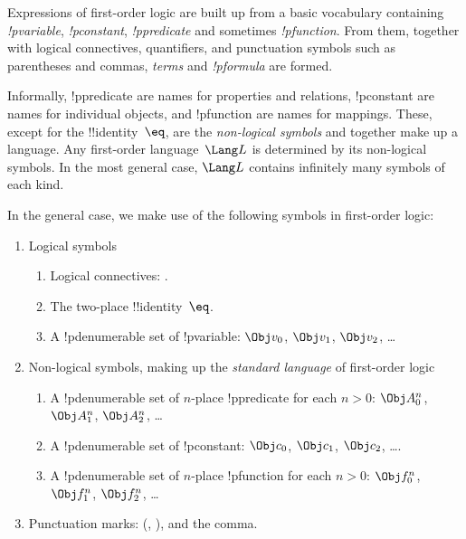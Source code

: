\documentclass[../../include/open-logic-section]{subfiles}
\begin{document}



Expressions of first-order logic are built up from a basic vocabulary
containing \emph{!p{variable}}, \emph{!p{constant}},
\emph{!p{predicate}} and sometimes \emph{!p{function}}.  From them,
together with logical connectives, quantifiers, and punctuation
symbols such as parentheses and commas, \emph{terms} and
\emph{!p{formula}} are formed.

\begin{explain}
Informally, !p{predicate} are names for properties and relations,
!p{constant} are names for individual objects, and !p{function} are
names for mappings.  These, except for the !!{identity}~$\eq$, are the
\emph{non-logical symbols} and together make up a language.  Any
first-order language~$\Lang L$ is determined by its non-logical
symbols.  In the most general case, $\Lang L$ contains infinitely many
symbols of each kind.
\end{explain}

In the general case, we make use of the following symbols in
first-order logic:

\begin{enumerate}
\item Logical symbols
\begin{enumerate}
\item Logical connectives:
  \startycommalist
  .
\item The two-place !!{identity}~$\eq$.
\item A !p{denumerable} set of !p{variable}: $\Obj v_0$, $\Obj v_1$, $\Obj
  v_2$, \dots
\end{enumerate}
\item Non-logical symbols, making up the \emph{standard
  language} of first-order logic
\begin{enumerate}
\item A !p{denumerable} set of $n$-place !p{predicate} for each $n>0$: $\Obj
  A^n_0$, $\Obj A^n_1$, $\Obj A^n_2$, \dots
\item A !p{denumerable} set of !p{constant}: $\Obj c_0$, $\Obj c_1$, $\Obj
  c_2$, \dots.
\item A !p{denumerable} set of $n$-place !p{function} for each $n>0$:
  $\Obj f^n_0$, $\Obj f^n_1$, $\Obj f^n_2$, \dots
\end{enumerate}
\item Punctuation marks: (, ), and the comma.
\end{enumerate}
\end{document}
